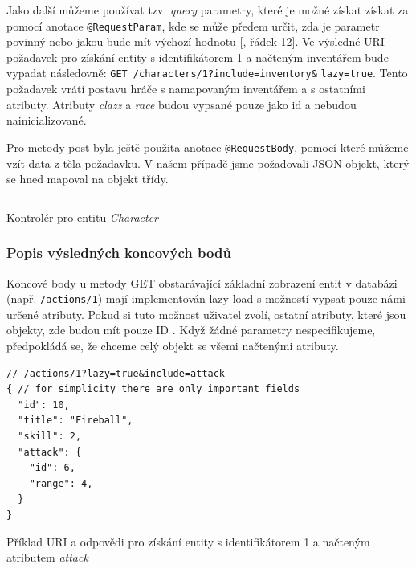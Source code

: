 Jako další můžeme používat tzv. \textit{query} parametry, které je možné získat získat za pomocí anotace \texttt{@RequestParam}, kde se může předem určit, zda je parametr povinný nebo jakou bude mít výchozí hodnotu [, řádek 12]. Ve výsledné URI požadavek pro získání entity s identifikátorem 1 a načteným inventářem bude vypadat následovně: \texttt{GET /characters/1?include=inventory\&} \texttt{lazy=true}. Tento požadavek vrátí postavu hráče s namapovaným inventářem a s ostatními atributy. Atributy \textit{clazz} a \textit{race} 
budou vypsané pouze jako id a nebudou nainicializované.

Pro metody post byla ještě použita anotace \texttt{@RequestBody}, pomocí které můžeme vzít data z těla požadavku. V našem případě jsme požadovali JSON objekt, který se hned mapoval na objekt třídy.

\begin{listing}[h!]
    \inputminted[]{Java}{resources/code/impl/CharacterController.java}
    \caption{Kontrolér pro entitu \textit{Character}}
    \label{code:characterController}
\end{listing}

\subsubsection*{Popis výsledných koncových bodů}\label{sec:impl:endpoints:desc}   %
Koncové body u metody GET obstarávající základní zobrazení entit v databázi (např. \texttt{/actions/1}) mají implementován lazy load  s možností vypsat pouze námi určené atributy. Pokud si tuto možnost uživatel zvolí, ostatní atributy, které jsou objekty, zde budou mít pouze ID . Když žádné parametry nespecifikujeme, předpokládá se, že chceme celý objekt se všemi načtenými atributy.

\begin{listing}[H]
    \begin{verbatim}
// /actions/1?lazy=true&include=attack 
{ // for simplicity there are only important fields
  "id": 10,
  "title": "Fireball",
  "skill": 2,
  "attack": {
    "id": 6,
    "range": 4,
  }
}
    \end{verbatim}
    \caption{Příklad URI a odpovědi pro získání entity s identifikátorem 1 a načteným atributem \textit{attack}}
    \label{code:action:endpoint:single}
\end{listing}

